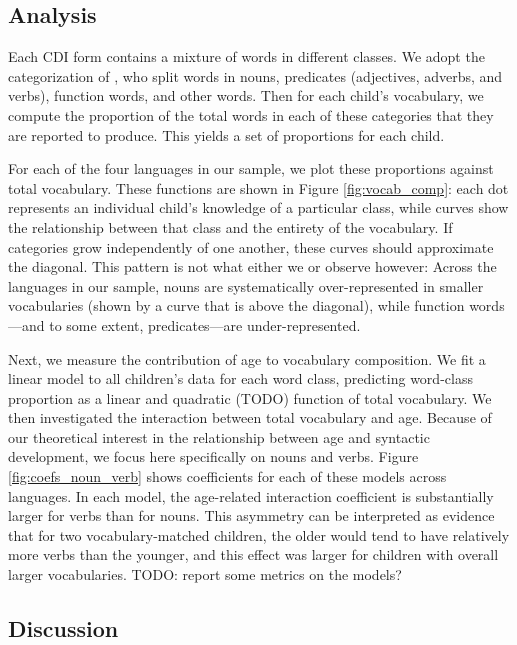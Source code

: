 \documentclass[10pt,letterpaper]{article}
\begin{document}
\subsection{Analysis}

Each CDI form contains a mixture of words in different classes. We adopt the categorization of , who split words in nouns, predicates (adjectives, adverbs, and verbs), function words, and other words. Then for each child's vocabulary, we compute the proportion of the total words in each of these categories that they are reported to produce. This yields a set of proportions for each child.

For each of the four languages in our sample, we plot these proportions against total vocabulary. These functions are shown in Figure \ref{fig:vocab_comp}: each dot represents an individual child's knowledge of a particular class, while curves show the relationship between that class and the entirety of the vocabulary. If categories grow independently of one another, these curves should approximate the diagonal. This pattern is not what either we or \citeauthor{bates1994} observe however: Across the languages in our sample, nouns are systematically over-represented in smaller vocabularies (shown by a curve that is above the diagonal), while function words---and to some extent, predicates---are under-represented. 

Next, we measure the contribution of age to vocabulary composition. We fit a linear model to all children's data for each word class, predicting word-class proportion as a linear and quadratic (TODO) function of total vocabulary. We then investigated the interaction between total vocabulary and age. Because of our theoretical interest in the relationship between age and syntactic development, we focus here specifically on nouns and verbs. Figure \ref{fig:coefs_noun_verb} shows coefficients for each of these models across languages. In each model, the age-related interaction coefficient is substantially larger for verbs than for nouns. This asymmetry can be interpreted as evidence that for two vocabulary-matched children, the older would tend to have relatively more verbs than the younger, and this effect was larger for children with overall larger vocabularies. TODO: report some metrics on the models?

\subsection{Discussion}
\end{document}
